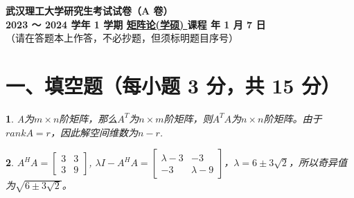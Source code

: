 \documentclass[11pt, a4paper]{article}
\newtheorem{lt}{}
\begin{document}
\begin{center}
    {\LARGE \textbf{武汉理工大学研究生考试试卷（A 卷）}} \\
    \vspace{0.5cm}
    \textbf{2023 ～ 2024 学年 1 学期 \underline{\quad 矩阵论(学硕) \quad} 课程  年 1 月 7 日} \\
    （请在答题本上作答，不必抄题，但须标明题目序号）
\end{center}

\vspace{0.5cm}

\section*{一、填空题（每小题 3 分，共 15 分）}
\begin{lt}
A为$m\times n$阶矩阵，那么$A^T$为$n\times m$阶矩阵，则$A^TA$为$n\times n$阶矩阵。由于$rankA=r$，因此解空间维数为$n-r$.
\end{lt}

\begin{lt}
$A^HA=\begin{bmatrix}
3&3\\3&9
\end{bmatrix}$,
$\lambda I-A^HA=\begin{bmatrix}
\lambda-3&-3\\-3&\lambda-9
\end{bmatrix}$，$\lambda = 6\pm3\sqrt{2}$，所以奇异值为$\sqrt{6\pm3\sqrt{2}}$。
\end{lt}
\end{document}
